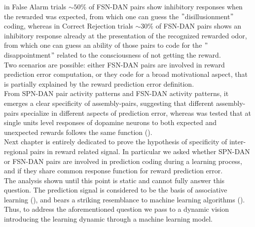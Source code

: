 in False Alarm trials $\sim 50\%$ of FSN-DAN pairs show inhibitory responses when the rewarded was expected, from which one can guess the $"$disillusionment$"$ coding, whereas in Correct Rejection trials $\sim 30\%$ of FSN-DAN pairs shows an inhibitory response already at the presentation of the recognized rewarded odor, from which one can guess an ability of those pairs to code for the $"$disappointment$"$ related to the consciousness of not getting the reward.\\Two scenarios are possible: either FSN-DAN pairs are involved in reward prediction error computation, or they code for a broad motivational aspect, that is partially explained by the reward prediction error definition.\\From SPN-DAN pair activity patterns and FSN-DAN activity patterns, it emerges a clear specificity of assembly-pairs, suggesting that different assembly-pairs specialize in different aspects of prediction error, whereas was tested that at single units level responses of dopamine neurons to both expected and unexpected rewards follows the same function (\cite{UchidaDop}).\\Next chapter is entirely dedicated to prove the hypothesis of specificity of inter-regional pairs in reward related signal. In particular we asked whether SPN-DAN or FSN-DAN pairs are involved in prediction coding during a learning process, and if they share common response function for reward prediction error.\\The analysis shown until this point is static and cannot fully answer this question. The prediction signal is considered to be the basis of associative learning (\cite{RescorlaWagner}), and bears a striking resemblance to machine learning algorithms (\cite{SuttonBarto}). Thus, to address the aforementioned question we pass to a dynamic vision introducing the learning dynamic through a machine learning model.


